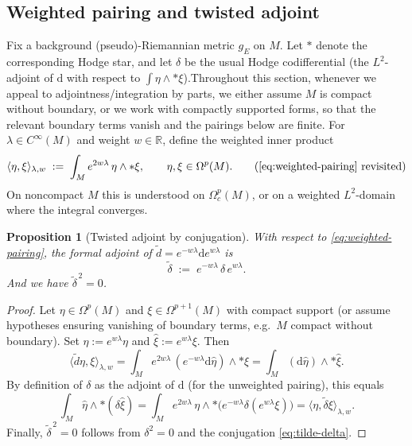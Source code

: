 \documentclass[preprint,12pt]{elsarticle}
\theoremstyle{plain}
\newtheorem{proposition}[theorem]{Proposition}
\theoremstyle{definition}
\theoremstyle{note}
\newcommand{\R}{\mathbb{R}}
\newcommand{\dd}{\mathrm{d}}
\newcommand{\wtd}{\tilde d}
\newcommand{\wtdel}{\tilde\delta}
\begin{document}
\subsection{Weighted pairing and twisted adjoint}
Fix a background (pseudo)-Riemannian metric $g_E$ on $M$. Let $*$ denote the corresponding Hodge star, and let $\delta$ be the usual Hodge codifferential (the $L^2$-adjoint of $\dd$ with respect to $\int \eta\wedge *\xi$).Throughout this section, whenever we appeal to adjointness/integration by parts, we either assume $M$ is compact without boundary, or we work with compactly supported forms, so that the relevant boundary terms vanish and the pairings below are finite.
For $\lambda\in C^\infty(M)$ and weight $w\in\R$, define the weighted inner product
\begin{equation}\label{eq:weighted-inner-product}
\langle \eta,\xi\rangle_{\lambda,w}
\;:=\;
\int_M e^{2w\lambda}\,\eta\wedge *\xi,
\qquad \eta,\xi\in\Omega^p(M). \tag{\ref{eq:weighted-pairing} revisited}
\end{equation}
On noncompact $M$ this is understood on $\Omega^p_c(M)$, or on a weighted $L^2$-domain where the integral converges.

\begin{proposition}[Twisted adjoint by conjugation]\label{prop:twisted-adjoint}
With respect to \eqref{eq:weighted-pairing}, the formal adjoint of $\wtd=e^{-w\lambda}\dd e^{w\lambda}$ is
\begin{equation}\label{eq:tilde-delta}
\wtdel \;:=\; e^{-w\lambda}\,\delta\,e^{w\lambda}.
\end{equation}
And we have $\wtdel^{\,2}=0$. 
\end{proposition}

\begin{proof}
Let $\eta\in\Omega^{p}(M)$ and $\xi\in\Omega^{p+1}(M)$ with compact support (or assume hypotheses ensuring vanishing of boundary terms, e.g.\ $M$ compact without boundary). Set $\hat\eta:=e^{w\lambda}\eta$ and $\hat\xi:=e^{w\lambda}\xi$.
Then
\[
\langle \wtd\eta,\xi\rangle_{\lambda,w}
=
\int_M e^{2w\lambda}\,(e^{-w\lambda}\dd\hat\eta)\wedge *\xi
=
\int_M (\dd\hat\eta)\wedge *\hat\xi.
\]
By definition of $\delta$ as the adjoint of $\dd$ (for the unweighted pairing), this equals
\[
\int_M \hat\eta\wedge *(\delta\hat\xi)
=
\int_M e^{2w\lambda}\,\eta\wedge *\big(e^{-w\lambda}\delta(e^{w\lambda}\xi)\big)
=
\langle \eta,\wtdel\xi\rangle_{\lambda,w}.
\]
Finally, $\wtdel^{\,2}=0$ follows from $\delta^2=0$ and the conjugation \eqref{eq:tilde-delta}.
\end{proof}
\end{document}
